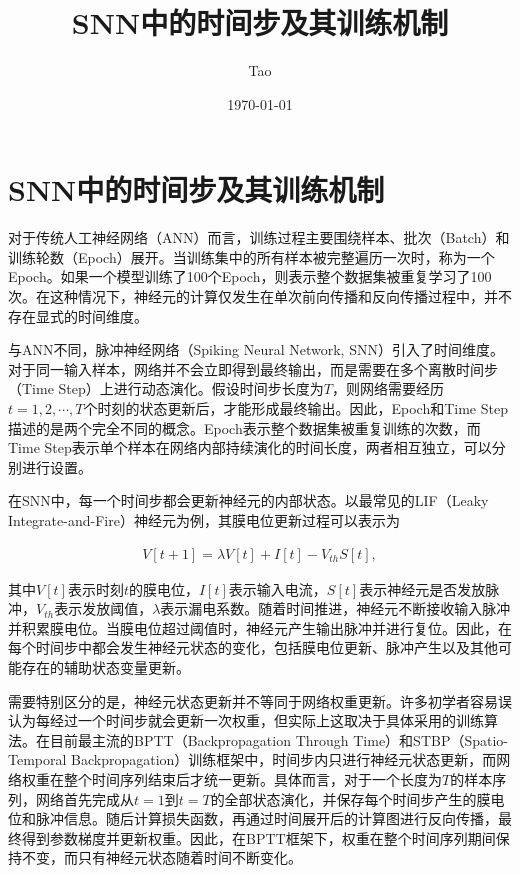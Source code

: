 \documentclass[journal,12pt,onecolumn]{IEEEtran}
\begin{document}
\title{SNN中的时间步及其训练机制}
\author{Tao}
\date{\today}
\maketitle

\section{SNN中的时间步及其训练机制}

对于传统人工神经网络（ANN）而言，训练过程主要围绕样本、批次（Batch）和训练轮数（Epoch）展开。当训练集中的所有样本被完整遍历一次时，称为一个Epoch。如果一个模型训练了100个Epoch，则表示整个数据集被重复学习了100次。在这种情况下，神经元的计算仅发生在单次前向传播和反向传播过程中，并不存在显式的时间维度。

与ANN不同，脉冲神经网络（Spiking Neural Network, SNN）引入了时间维度。对于同一输入样本，网络并不会立即得到最终输出，而是需要在多个离散时间步（Time Step）上进行动态演化。假设时间步长度为$T$，则网络需要经历$t=1,2,\cdots,T$个时刻的状态更新后，才能形成最终输出。因此，Epoch和Time Step描述的是两个完全不同的概念。Epoch表示整个数据集被重复训练的次数，而Time Step表示单个样本在网络内部持续演化的时间长度，两者相互独立，可以分别进行设置。

在SNN中，每一个时间步都会更新神经元的内部状态。以最常见的LIF（Leaky Integrate-and-Fire）神经元为例，其膜电位更新过程可以表示为

\begin{align}
V[t+1] = \lambda V[t] + I[t] - V_{th}S[t],
\end{align}

其中$V[t]$表示时刻$t$的膜电位，$I[t]$表示输入电流，$S[t]$表示神经元是否发放脉冲，$V_{th}$表示发放阈值，$\lambda$表示漏电系数。随着时间推进，神经元不断接收输入脉冲并积累膜电位。当膜电位超过阈值时，神经元产生输出脉冲并进行复位。因此，在每个时间步中都会发生神经元状态的变化，包括膜电位更新、脉冲产生以及其他可能存在的辅助状态变量更新。

需要特别区分的是，神经元状态更新并不等同于网络权重更新。许多初学者容易误认为每经过一个时间步就会更新一次权重，但实际上这取决于具体采用的训练算法。在目前最主流的BPTT（Backpropagation Through Time）和STBP（Spatio-Temporal Backpropagation）训练框架中，时间步内只进行神经元状态更新，而网络权重在整个时间序列结束后才统一更新。具体而言，对于一个长度为$T$的样本序列，网络首先完成从$t=1$到$t=T$的全部状态演化，并保存每个时间步产生的膜电位和脉冲信息。随后计算损失函数，再通过时间展开后的计算图进行反向传播，最终得到参数梯度并更新权重。因此，在BPTT框架下，权重在整个时间序列期间保持不变，而只有神经元状态随着时间不断变化。
\end{document}

